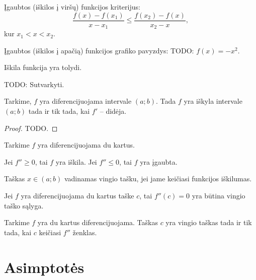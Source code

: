 \begin{defn}
  Įgaubtos (iškilos į viršų) funkcijos kriterijus:
  \begin{equation*}
    \frac{f(x) - f(x_{1})}{x - x_{1}}
    \leq \frac{f(x_{2}) - f(x)}{x_{2} - x},
  \end{equation*}
  kur $x_{1} < x < x_{2}$.
\end{defn}

\begin{exmp}
  Įgaubtos (iškilos į apačią) funkcijos grafiko pavyzdys: 
  TODO: $f(x) = -x^{2}$.
\end{exmp}

\begin{prop}
  Iškila funkcija yra tolydi.
\end{prop}

\begin{prop}
  TODO: Sutvarkyti.

  Tarkime, $f$ yra diferencijuojama intervale $(a; b)$. Tada $f$ yra
  iškyla intervale $(a; b)$ tada ir tik tada, kai $f'$ – didėja.

  \begin{proof}
    TODO.
  \end{proof}
\end{prop}

\begin{prop}
  Tarkime $f$ yra diferencijuojama du kartus.

  Jei $f'' \geq 0$, tai $f$ yra iškila.
  Jei $f'' \leq 0$, tai $f$ yra įgaubta.
\end{prop}

\begin{defn}
  Taškas $x \in (a; b)$ vadinamas vingio tašku, jei jame keičiasi funkcijos
  iškilumas.
\end{defn}

\begin{prop}
  Jei $f$ yra diferencijuojama du kartus taške $c$, tai 
  $f''(c) = 0$ yra būtina vingio taško sąlyga.
\end{prop}

\begin{prop}
  Tarkime $f$ yra du kartus diferencijuojama. Taškas $c$ yra vingio
  taškas tada ir tik tada, kai $c$ keičiasi $f''$ ženklas.
\end{prop}

\section{Asimptotės}

